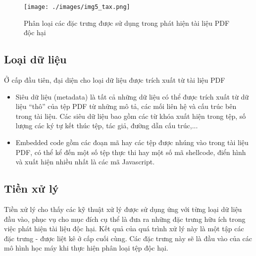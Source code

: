 \documentclass[./../main.tex]{subfiles}
\begin{document}
\begin{figure}[ht!]
	\centering
	\texttt{[image: ./images/img5\_tax.png]}
	\caption{Phân loại các đặc trưng được sử dụng trong phát hiện tài liệu PDF độc hại}
	\label{fig:img5_tax}
\end{figure}


\subsection*{Loại dữ liệu}
Ở cấp đầu tiên, đại diện cho loại dữ liệu được trích xuất từ tài liệu PDF

\begin{itemize}
	\item Siêu dữ liệu (metadata) là tất cả những dữ liệu có thể được trích xuất từ dữ liệu “thô” của tệp PDF từ những mô tả, các mối liên hệ và cấu trúc bên trong tài liệu. Các siêu dữ liệu bao gồm các từ khóa xuất hiện trong tệp, số lượng các ký tự kết thúc tệp, tác giả, đường dẫn cấu trúc,...
	\item Embedded code gồm các đoạn mã hay các tệp được nhúng vào trong tài liệu PDF, có thể kể đến một số tệp thực thi hay một số mã shellcode, điển hình và xuất hiện nhiều nhất là các mã Javascript.
\end{itemize}


\subsection*{Tiền xử lý}
Tiền xử lý cho thấy các kỹ thuật xử lý được sử dụng ứng với từng loại dữ liệu đầu vào, phục vụ cho mục đích cụ thể là đưa ra những đặc trưng hữu ích trong việc phát hiện tài liệu độc hại. Kết quả của quá trình xử lý này là một tập các đặc trưng - được liệt kê ở cấp cuối cùng. Các đặc trưng này sẽ là đầu vào của các mô hình học máy khi thực hiện phân loại tệp độc hại.
\end{document}
